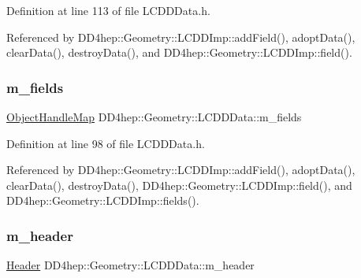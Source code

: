 Definition at line 113 of file L\+C\+D\+D\+Data.\+h.



Referenced by D\+D4hep\+::\+Geometry\+::\+L\+C\+D\+D\+Imp\+::add\+Field(), adopt\+Data(), clear\+Data(), destroy\+Data(), and D\+D4hep\+::\+Geometry\+::\+L\+C\+D\+D\+Imp\+::field().

\hypertarget{class_d_d4hep_1_1_geometry_1_1_l_c_d_d_data_a16e560764499fe2e5756b9317fcccacd}{}\label{class_d_d4hep_1_1_geometry_1_1_l_c_d_d_data_a16e560764499fe2e5756b9317fcccacd} 
\subsubsection{\texorpdfstring{m\+\_\+fields}{m\_fields}}
{\footnotesize\ttfamily \hyperlink{class_d_d4hep_1_1_geometry_1_1_l_c_d_d_data_1_1_object_handle_map}{Object\+Handle\+Map} D\+D4hep\+::\+Geometry\+::\+L\+C\+D\+D\+Data\+::m\+\_\+fields\hspace{0.3cm}{\ttfamily [protected]}}



Definition at line 98 of file L\+C\+D\+D\+Data.\+h.



Referenced by D\+D4hep\+::\+Geometry\+::\+L\+C\+D\+D\+Imp\+::add\+Field(), adopt\+Data(), clear\+Data(), destroy\+Data(), D\+D4hep\+::\+Geometry\+::\+L\+C\+D\+D\+Imp\+::field(), and D\+D4hep\+::\+Geometry\+::\+L\+C\+D\+D\+Imp\+::fields().

\hypertarget{class_d_d4hep_1_1_geometry_1_1_l_c_d_d_data_a0df630bab0fd0325f35007d17dea2292}{}\label{class_d_d4hep_1_1_geometry_1_1_l_c_d_d_data_a0df630bab0fd0325f35007d17dea2292} 
\subsubsection{\texorpdfstring{m\+\_\+header}{m\_header}}
{\footnotesize\ttfamily \hyperlink{class_d_d4hep_1_1_geometry_1_1_header}{Header} D\+D4hep\+::\+Geometry\+::\+L\+C\+D\+D\+Data\+::m\+\_\+header\hspace{0.3cm}{\ttfamily [protected]}}



